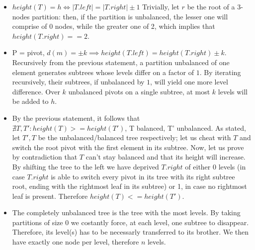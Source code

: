 \documentclass{article}
\begin{document}
    \begin{itemize}
    \item $height(T) = h \iff |T.left| = |T.right| \pm 1$ Trivially, let $r$ be
    the root  of a 3-nodes partition: then, if the partition is unbalanced, the
    lesser one will comprise of 0 nodes, while the greater one of 2, which implies
    that $height(T.right) == 2$.
    \label{k_distance} \item P = pivot,
    $d(m) = \pm k \implies height(T.left) = height(T.right) \pm k$.
    Recursively from the previous statement, a partition unbalanced of one element
    generates subtrees whose levels differ on a factor of $1$.
    By iterating recursively, their subtrees, if unbalanced by $1$, will yield
    one more level difference.
    Over $k$ unbalanced pivots on a single subtree, at most $k$ levels will be
    added to $h$.
    \item By the previous statement, it follows that $\nexists T, T': height(T) >= height(T')$,
    T balanced, T' unbalanced.
    As stated, let $T', T$ be the unbalanced/balanced tree respectively; let us
    cheat with $T$ and switch the root pivot with the first element in its subtree.
    Now, let us prove by contradiction that $T$ can't stay balanced and that its
    height will increase.
    By shifting the tree to the left we have deprived $T.right$ of either 0 levels
    (in case $T.right$ is able to switch every pivot in its tree with its right
    subtree root, ending with the rightmost leaf in its subtree) or 1, in case no
    rightmost leaf is present.
    Therefore $height(T) <= height(T')$.
    \item The completely unbalanced tree is the tree with the most levels.
    By taking partitions of size 0 we costantly force, at each level, one subtree
    to disappear.
    Therefore, its level(s) has to be necessarly transferred to its brother.
    We then have exactly one node per level, therefore $n$ levels.
    \end{itemize}
\end{document}
